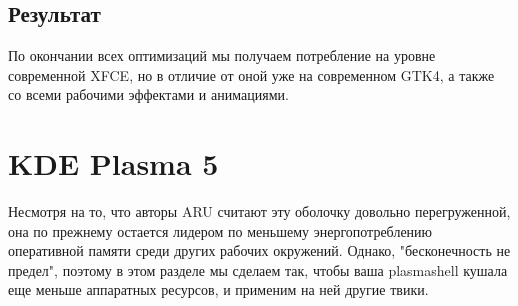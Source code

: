 \documentclass[letterpaper,10pt,russian,openany]{sphinxmanual}
\begin{document}
\ignorespaces 

\subsection{Результат}
\label{\detokenize{source/de-optimizations:gnome-result}}\label{\detokenize{source/de-optimizations:index-7}}\label{\detokenize{source/de-optimizations:id3}}
\sphinxAtStartPar
По окончании всех оптимизаций мы получаем потребление на уровне современной XFCE,
но в отличие от оной уже на современном GTK4, а также со всеми рабочими эффектами и анимациями.

\noindent{}

\sphinxAtStartPar
{}

\sphinxAtStartPar
{}

\sphinxAtStartPar
{}

\sphinxAtStartPar
{}

\ignorespaces 

\section{KDE Plasma 5}
\label{\detokenize{source/de-optimizations:kde-plasma-5}}\label{\detokenize{source/de-optimizations:plasma-optimization}}\label{\detokenize{source/de-optimizations:index-8}}
\sphinxAtStartPar
Несмотря на то, что авторы ARU считают эту оболочку довольно перегруженной,
она по прежнему остается лидером по меньшему энергопотреблению оперативной памяти среди других рабочих окружений.
Однако, "бесконечность \sphinxhyphen{} не предел", поэтому в этом разделе мы сделаем так,
чтобы ваша plasma\sphinxhyphen{}shell кушала еще меньше аппаратных ресурсов, и применим на ней другие твики.

\ignorespaces 
\end{document}
